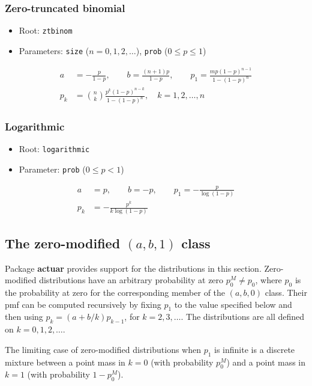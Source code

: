 \documentclass[x11names]{article}
\newcommand{\pkg}[1]{\textbf{#1}}
\newcommand{\code}[1]{\texttt{#1}}
\begin{document}
\subsubsection{Zero-truncated binomial}

\begin{itemize}
\item Root: \code{ztbinom}
\item Parameters: \code{size} ($n = 0, 1, 2, \dots$),
  \code{prob} ($0 \leq p \leq 1$)
\end{itemize}
\begin{align*}
  a &= -\frac{p}{1 - p}, \qquad b = \frac{(n + 1)p}{1 - p}, \qquad
      p_1 = \frac{m p (1 - p)^{n - 1}}{1 - (1 - p)^n} \\
  p_k &= \binom{n}{k} \frac{p^k (1 - p)^{n - k}}{1 - (1 - p)^n}, \quad
        k = 1, 2, \dots, n
\end{align*}

\subsubsection{Logarithmic}

\begin{itemize}
\item Root: \code{logarithmic}
\item Parameter: \code{prob} ($0 \leq p < 1$)
\end{itemize}
\begin{align*}
  a &= p, \qquad b = -p, \qquad
      p_1 = - \frac{p}{\log (1 - p)} \\
  p_k &= - \frac{p^k}{k \log (1 - p)}
\end{align*}

\subsection[The zero-modified (a, b, 1) class]{The zero-modified $(a, b, 1)$ class}
\label{sec:app:discrete:zm}

Package \pkg{actuar} provides support for the distributions in this
section. Zero-modified distributions have an arbitrary probability at
zero $p_0^M \neq p_0$, where $p_0$ is the probability at zero for the
corresponding member of the $(a, b, 0)$ class. Their pmf can be
computed recursively by fixing $p_1$ to the value specified below and
then using $p_k = (a + b/k) p_{k - 1}$, for $k = 2, 3, \dots$. The
distributions are all defined on $k = 0, 1, 2, \dots$.

The limiting case of zero-modified distributions when $p_1$ is
infinite is a discrete mixture between a point mass in $k = 0$ (with
probability $p_0^M$) and a point mass in $k = 1$ (with probability
$1 - p_0^M$).
\end{document}
